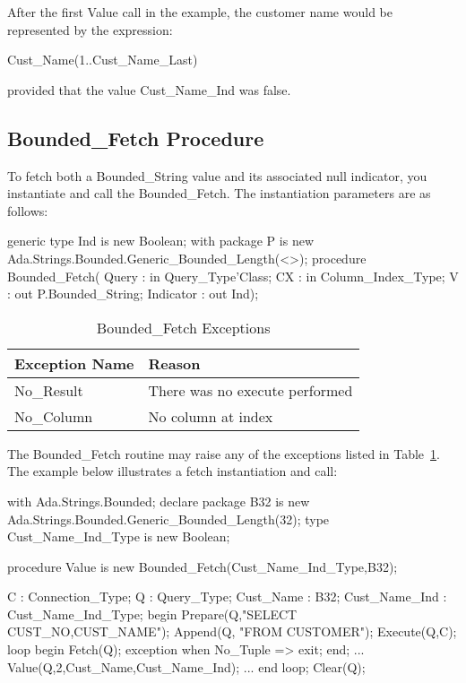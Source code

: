 \documentclass[english,letterpaper]{book}
\begin{document}
After the first Value call in the example, the customer name would
be represented by the expression:

\begin{Code}

   Cust_Name(1..Cust_Name_Last)

\end{Code}

provided that the value Cust\_Name\_Ind was false.


\subsection{Bounded\_Fetch Procedure}

To fetch both a Bounded\_String value and its associated null indicator,
you instantiate and call the Bounded\_Fetch. The instantiation
parameters are as follows:

\begin{Code}
generic
   type Ind is new Boolean;
   with package P is new 
      Ada.Strings.Bounded.Generic_Bounded_Length(<>);
procedure Bounded_Fetch(
   Query :     in     Query_Type'Class;
   CX :        in     Column_Index_Type;
   V :            out P.Bounded_String;
   Indicator :    out Ind);
\end{Code}

\begin{table}
   \begin{center}
      \begin{tabular}{ll}
         Exception Name    &  Reason\\
         \hline 
         No\_Result        &  There was no execute performed\\
         No\_Column        &  No column at index\\
      \end{tabular}
   \end{center}
   \caption{Bounded\_Fetch Exceptions}\label{t:bfx2}
\end{table}

The Bounded\_Fetch routine may raise any of the exceptions listed in Table~\ref{t:bfx2}.
The example below illustrates a fetch instantiation and call:

\begin{Example}
with Ada.Strings.Bounded;
declare
   package B32 is new 
      Ada.Strings.Bounded.Generic_Bounded_Length(32);
   type Cust_Name_Ind_Type is new Boolean;

   procedure Value is new 
      Bounded_Fetch(Cust_Name_Ind_Type,B32);

   C :              Connection_Type;
   Q :              Query_Type;
   Cust_Name :      B32;
   Cust_Name_Ind :  Cust_Name_Ind_Type;
begin
   Prepare(Q,"SELECT CUST_NO,CUST_NAME");
   Append(Q, "FROM CUSTOMER");
   Execute(Q,C);
   loop
      begin
         Fetch(Q);
      exception
         when No_Tuple =>
            exit;
      end;
      ...
      Value(Q,2,Cust_Name,Cust_Name_Ind); 
      ...
   end loop;
   Clear(Q);
\end{Example}
\end{document}
